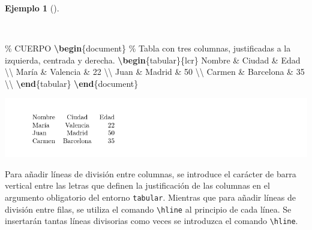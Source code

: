 \documentclass[
  a4paper,
]{scrreport}
\newenvironment{Shaded}{\begin{snugshade}}{\end{snugshade}}
\newcommand{\CommentTok}[1]{\textcolor[rgb]{0.37,0.37,0.37}{#1}}
\newcommand{\ExtensionTok}[1]{\textcolor[rgb]{0.00,0.23,0.31}{#1}}
\newcommand{\FunctionTok}[1]{\textcolor[rgb]{0.28,0.35,0.67}{#1}}
\newcommand{\KeywordTok}[1]{\textcolor[rgb]{0.00,0.23,0.31}{\textbf{#1}}}
\newcommand{\NormalTok}[1]{\textcolor[rgb]{0.00,0.23,0.31}{#1}}
\newcommand{\OperatorTok}[1]{\textcolor[rgb]{0.37,0.37,0.37}{#1}}
\theoremstyle{definition}
\newtheorem{example}{Ejemplo}[chapter]
\theoremstyle{remark}
\begin{document}
\begin{example}[]\protect\hypertarget{exm-tabla}{}\label{exm-tabla}

~

\begin{Shaded}
\begin{Highlighting}[]
\CommentTok{\% CUERPO}
\KeywordTok{\textbackslash{}begin}\NormalTok{\{}\ExtensionTok{document}\NormalTok{\}}
\CommentTok{\% Tabla con tres columnas, justificadas a la izquierda, centrada y derecha.}
\KeywordTok{\textbackslash{}begin}\NormalTok{\{}\ExtensionTok{tabular}\NormalTok{\}\{lcr\}}
\NormalTok{Nombre }\OperatorTok{\&}\NormalTok{ Ciudad }\OperatorTok{\&}\NormalTok{ Edad }\FunctionTok{\textbackslash{}\textbackslash{}}
\NormalTok{María }\OperatorTok{\&}\NormalTok{ Valencia }\OperatorTok{\&}\NormalTok{ 22 }\FunctionTok{\textbackslash{}\textbackslash{}}
\NormalTok{Juan }\OperatorTok{\&}\NormalTok{ Madrid }\OperatorTok{\&}\NormalTok{ 50 }\FunctionTok{\textbackslash{}\textbackslash{}}
\NormalTok{Carmen }\OperatorTok{\&}\NormalTok{ Barcelona }\OperatorTok{\&}\NormalTok{ 35 }\FunctionTok{\textbackslash{}\textbackslash{}}
\KeywordTok{\textbackslash{}end}\NormalTok{\{}\ExtensionTok{tabular}\NormalTok{\}}
\KeywordTok{\textbackslash{}end}\NormalTok{\{}\ExtensionTok{document}\NormalTok{\}}
\end{Highlighting}
\end{Shaded}

\begin{tcolorbox}[enhanced jigsaw, colframe=quarto-callout-note-color-frame, opacityback=0, title={Salida}, bottomrule=.15mm, left=2mm, coltitle=black, arc=.35mm, leftrule=.75mm, colback=white, rightrule=.15mm, colbacktitle=quarto-callout-note-color!10!white, toprule=.15mm, breakable, opacitybacktitle=0.6, bottomtitle=1mm, toptitle=1mm, titlerule=0mm]

\includegraphics{img/tablas/tabla-simple.png}

\end{tcolorbox}

\end{example}

Para añadir líneas de división entre columnas, se introduce el carácter
de barra vertical \texttt{\textbar{}} entre las letras que definen la
justificación de las columnas en el argumento obligatorio del entorno
\texttt{tabular}. Mientras que para añadir líneas de división entre
filas, se utiliza el comando \texttt{\textbackslash{}hline} al principio
de cada línea. Se insertarán tantas líneas divisorias como veces se
introduzca el comando \texttt{\textbackslash{}hline}.
\end{document}
